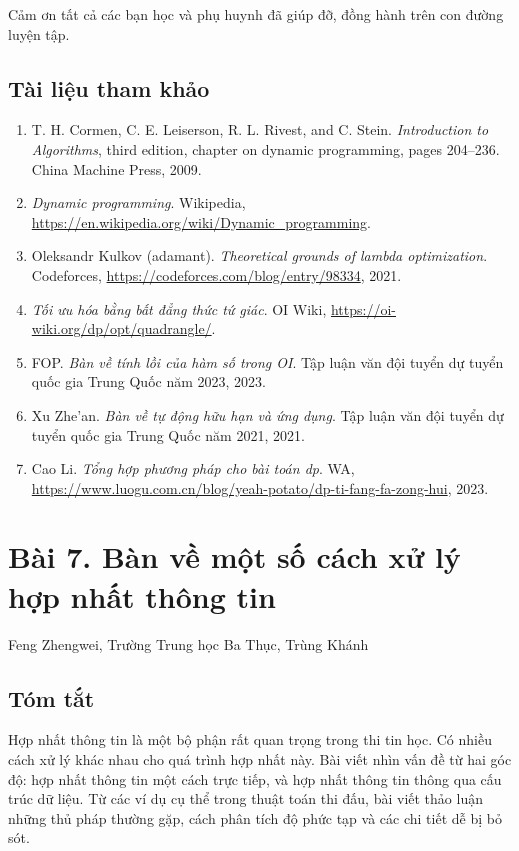 \documentclass[11pt]{article}
\begin{document}
Cảm ơn tất cả các bạn học và phụ huynh đã giúp đỡ, đồng hành trên con đường
luyện tập.

\subsection*{Tài liệu tham khảo}

\begin{enumerate}
  \item T. H. Cormen, C. E. Leiserson, R. L. Rivest, and C. Stein.
  \emph{Introduction to Algorithms}, third edition, chapter on dynamic
  programming, pages 204--236. China Machine Press, 2009.
  \item \emph{Dynamic programming}. Wikipedia,
  \url{https://en.wikipedia.org/wiki/Dynamic_programming}.
  \item Oleksandr Kulkov (adamant). \emph{Theoretical grounds of lambda
  optimization}. Codeforces, \url{https://codeforces.com/blog/entry/98334},
  2021.
  \item \emph{Tối ưu hóa bằng bất đẳng thức tứ giác}. OI Wiki,
  \url{https://oi-wiki.org/dp/opt/quadrangle/}.
  \item FOP. \emph{Bàn về tính lồi của hàm số trong OI}. Tập luận văn đội tuyển
  dự tuyển quốc gia Trung Quốc năm 2023, 2023.
  \item Xu Zhe'an. \emph{Bàn về tự động hữu hạn và ứng dụng}. Tập luận văn đội
  tuyển dự tuyển quốc gia Trung Quốc năm 2021, 2021.
  \item Cao Li. \emph{Tổng hợp phương pháp cho bài toán dp}. WA,
  \url{https://www.luogu.com.cn/blog/yeah-potato/dp-ti-fang-fa-zong-hui},
  2023.
\end{enumerate}

\section*{Bài 7. Bàn về một số cách xử lý hợp nhất thông tin}

\begin{center}
Feng Zhengwei, Trường Trung học Ba Thục, Trùng Khánh
\end{center}

\subsection*{Tóm tắt}

Hợp nhất thông tin là một bộ phận rất quan trọng trong thi tin học. Có nhiều
cách xử lý khác nhau cho quá trình hợp nhất này. Bài viết nhìn vấn đề từ hai
góc độ: hợp nhất thông tin một cách trực tiếp, và hợp nhất thông tin thông qua
cấu trúc dữ liệu. Từ các ví dụ cụ thể trong thuật toán thi đấu, bài viết thảo
luận những thủ pháp thường gặp, cách phân tích độ phức tạp và các chi tiết dễ
bị bỏ sót.
\end{document}
